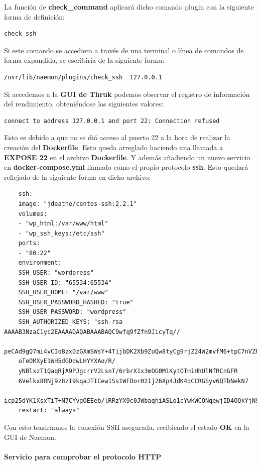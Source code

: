 La función de \textbf{check\_command} aplicará dicho comando plugin con la siguiente forma de definición:
\begin{lstlisting}	
check_ssh
\end{lstlisting} 

Si este comando se accediera a través de una terminal o línea de comandos de forma expandida, se escribiría de la siguiente forma:

\begin{lstlisting}
/usr/lib/naemon/plugins/check_ssh  127.0.0.1
\end{lstlisting}

Si accedemos a la \textbf{GUI de Thruk} podemos observar el registro de información del rendimiento, obteniéndose los siguientes valores:

\begin{lstlisting}
connect to address 127.0.0.1 and port 22: Connection refused
\end{lstlisting}

Esto es debido a que no se dió acceso al puerto 22 a la hora de realizar la creación del \textbf{Dockerfile}.
Esto queda arreglado haciendo una llamada a \textbf{EXPOSE 22} en el archivo \textbf{Dockerfile}.
\newpage
Y además añadiendo un nuevo servicio en \textbf{docker-compose.yml} llamado como el propio protocolo \textbf{ssh}. Esto quedará reflejado de la siguiente forma en dicho archivo:
\begin{lstlisting}
	ssh:
	image: "jdeathe/centos-ssh:2.2.1"
	volumes:
	- "wp_html:/var/www/html"
	- "wp_ssh_keys:/etc/ssh"
	ports:
	- "80:22"
	environment:
	SSH_USER: "wordpress"
	SSH_USER_ID: "65534:65534"
	SSH_USER_HOME: "/var/www"
	SSH_USER_PASSWORD_HASHED: "true"
	SSH_USER_PASSWORD: "wordpress"
	SSH_AUTHORIZED_KEYS: "ssh-rsa AAAAB3NzaC1yc2EAAAADAQABAAABAQC9wfq9fZfn9JicyTq//
	peCAd9gQ7mi4vCIoBzx0zGXmSWsY+4TijbDK2Xb9ZuQw8tyCg9rjZ24W2mvfM6+tpC7nVZRvvsSOji641hN9FamBt34+
	oTeOMXyE1WH5dGDdwLHYYXAo/R/
	yNBlxzT1QaqRjA9PJgcrrV2LsnT/6rbrX1x3mOG0M1KytOTHiHhUlNfRCnGFR
	6Velkx8RNj9z8zI9kqaJTICew1Ss1WFDo+02Ij26Xp4JdK4qCCRGSyv6QTbNekN7
	icp25dYK1XsxTiT+N7CYvgOEEeb/lRRzYX9c0JWbaqhiASLo1cYwkWCONqewjID4OQkYjN9JrqdOnb/"
	restart: "always"
\end{lstlisting}
Con esto tendríamos la conexión SSH asegurada, recibiendo el estado \textbf{OK} en la GUI de Naemon. 
\paragraph{Servicio para comprobar el protocolo HTTP}

